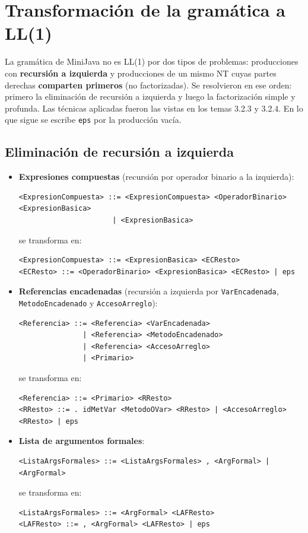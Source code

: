 \documentclass[11pt,a4paper]{article}
\begin{document}
\section{Transformación de la gramática a LL(1)}
\label{sec:transformacion}

La gramática de MiniJava no es LL(1) por dos tipos de problemas: producciones con
\textbf{recursión a izquierda} y producciones de un mismo NT cuyas partes derechas
\textbf{comparten primeros} (no factorizadas). Se resolvieron en ese orden: primero la
eliminación de recursión a izquierda y luego la factorización simple y profunda. Las
técnicas aplicadas fueron las vistas en los temas 3.2.3 y 3.2.4. En lo que sigue se
escribe \texttt{eps} por la producción vacía.

\subsection{Eliminación de recursión a izquierda}

\begin{itemize}
  \item \textbf{Expresiones compuestas} (recursión por operador binario a la izquierda):
{\footnotesize
\begin{verbatim}
<ExpresionCompuesta> ::= <ExpresionCompuesta> <OperadorBinario> <ExpresionBasica>
                      | <ExpresionBasica>
\end{verbatim}}
        se transforma en:
{\footnotesize
\begin{verbatim}
<ExpresionCompuesta> ::= <ExpresionBasica> <ECResto>
<ECResto> ::= <OperadorBinario> <ExpresionBasica> <ECResto> | eps
\end{verbatim}}
  \item \textbf{Referencias encadenadas} (recursión a izquierda por \texttt{VarEncadenada},
        \texttt{MetodoEncadenado} y \texttt{AccesoArreglo}):
{\footnotesize
\begin{verbatim}
<Referencia> ::= <Referencia> <VarEncadenada>
               | <Referencia> <MetodoEncadenado>
               | <Referencia> <AccesoArreglo>
               | <Primario>
\end{verbatim}}
        se transforma en:
{\footnotesize
\begin{verbatim}
<Referencia> ::= <Primario> <RResto>
<RResto> ::= . idMetVar <MetodoOVar> <RResto> | <AccesoArreglo> <RResto> | eps
\end{verbatim}}
  \item \textbf{Lista de argumentos formales}:
{\footnotesize
\begin{verbatim}
<ListaArgsFormales> ::= <ListaArgsFormales> , <ArgFormal> | <ArgFormal>
\end{verbatim}}
        se transforma en:
{\footnotesize
\begin{verbatim}
<ListaArgsFormales> ::= <ArgFormal> <LAFResto>
<LAFResto> ::= , <ArgFormal> <LAFResto> | eps
\end{verbatim}}
\end{itemize}
\end{document}
